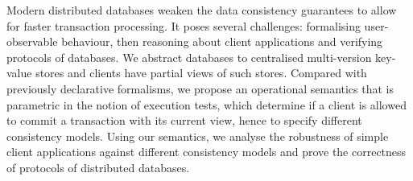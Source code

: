 Modern distributed databases weaken the data consistency guarantees 
to allow for faster transaction processing. 
It poses several challenges: formalising user-observable behaviour,
then reasoning about client applications 
and verifying protocols of databases.
We abstract databases to centralised multi-version key-value stores and 
clients have partial views of such stores.
Compared with previously declarative formalisms,
we propose an operational semantics that is parametric in the notion of execution tests, 
which determine if a client is allowed to commit a transaction with its current view,
hence to specify different consistency models. 
Using our semantics, 
we analyse the robustness of simple client applications 
against different consistency models and prove the correctness 
of protocols of distributed databases.
